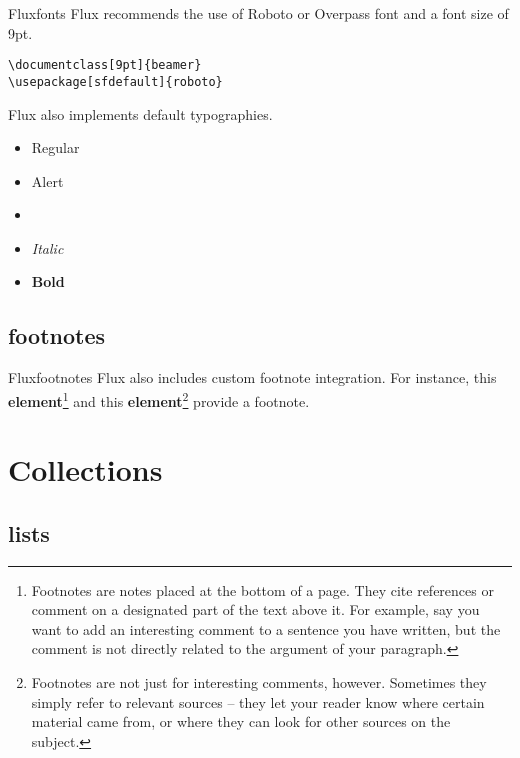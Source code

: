 \documentclass{beamer}
\begin{document}
\begin{frame}[fragile]{Flux}{fonts}
 Flux recommends the use of Roboto or Overpass font and a font size of 9pt.\\[0.2cm]
 \begin{center}
 	\verb+\documentclass[9pt]{beamer}+\\
	\verb+\usepackage[sfdefault]{roboto}+
 \end{center}
 
  Flux also implements default typographies.

	\begin{itemize}
		\item Regular
		\item \alert{Alert}
		\item {}
		\item \textit{Italic}
		\item \textbf{Bold}
	\end{itemize}
	
\end{frame}

\subsection{footnotes}

\begin{frame}{Flux}{footnotes}
		Flux also includes custom footnote integration. For instance, this \textbf{element}\footnote{Footnotes are notes placed at the bottom of a page. They cite references or comment on a designated part of the text above it. For example, say you want to add an interesting comment to a sentence you have written, but the comment is not directly related to the argument of your paragraph. } and this \textbf{element}\footnote{Footnotes are not just for interesting comments, however. Sometimes they simply refer to relevant sources -- they let your reader know where certain material came from, or where they can look for other sources on the subject.} provide a footnote.
\end{frame}

\section{Collections}
\subsection{lists}
\end{document}
